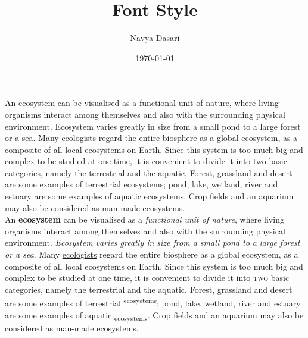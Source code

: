 \documentclass[12pt]{article}
\title{Font Style}
\author{Navya Dasari}
\date{\today}
\begin{document}
	
	\maketitle
	
	\paragraph{}
	
	An ecosystem can be visualised as a functional unit of nature, where living 
	organisms interact among themselves and also with the surrounding physical 
	environment. Ecosystem varies greatly in size from a small pond to a large forest or a 
	sea. Many ecologists regard the entire biosphere as a global ecosystem, as a composite 
	of all local ecosystems on Earth. Since this system is too much big and complex to be 
	studied at one time, it is convenient to divide it into two basic categories, namely the 
	terrestrial and the aquatic. Forest, grassland and desert are some examples of terrestrial 
	ecosystems; pond, lake, wetland, river and estuary are some examples of aquatic 
	ecosystems. Crop fields and an aquarium may also be considered as man-made 
	ecosystems. \\[12pt]
	
	
	An \textbf{ecosystem} can be visualised as a \textit{functional unit of nature}, where living 
	organisms interact among themselves and also with the surrounding physical 
	environment. \emph{Ecosystem varies greatly in size from a small pond to a large forest or a 
		sea}. Many \underline{ecologists} regard the entire biosphere as a global ecosystem, as a composite 
	of all local ecosystems on Earth. Since this system is too much big and complex to be 
	studied at one time, it is convenient to divide it into \textsc{two} basic categories, namely the 
	\textrm{terrestrial} and the \textsf{aquatic}. Forest, grassland and desert are some examples of terrestrial 
	\textsuperscript{ecosystems}; pond, lake, wetland, river and estuary are some examples of aquatic 
	\textsubscript{ecosystems}. Crop fields and an aquarium may also be considered as man-made 
	ecosystems.
\end{document}
